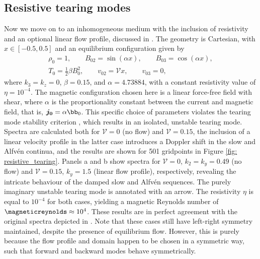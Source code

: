 \subsection{Resistive tearing modes}
Now we move on to an inhomogeneous medium with the inclusion of resistivity and an optional linear flow profile, discussed in \citet{book_MHD}. The geometry is Cartesian, with $x \in [-0.5, 0.5]$ and an equilibrium configuration given by
\begin{equation} \label{eq: resistive_tearing}
  \begin{gathered}
    \rho_0 = 1,
    \qquad
    B_{02} = \sin(\alpha x),
    \qquad
    B_{03} = \cos(\alpha x), \\
    T_0 = \frac{1}{2}\beta B_0^2,
    \qquad
    v_{02} = \mathcal{V}x,
    \qquad
    v_{03} = 0,
  \end{gathered}
\end{equation}
where $k_3 = k_z = 0$, $\beta = 0.15$, and $\alpha = 4.73884$, with a constant resistivity value of $\eta = 10^{-4}$. The magnetic configuration chosen here is a linear force-free field with shear, where $\alpha$ is the proportionality constant between the current and magnetic field, that is, $\boldsymbol{j_0} = \alpha \bb_0$. This specific choice of parameters violates the tearing mode stability criterion \citep{book_MHD}, which results in an isolated, unstable tearing mode. Spectra are calculated both for $\mathcal{V} = 0$ (no flow) and $\mathcal{V} = 0.15$, the inclusion of a linear velocity profile in the latter case introduces a Doppler shift in the slow and Alfv\'en continua, and the results are shown for 501 gridpoints in Figure \ref{fig: resistive_tearing}. Panels a and b show spectra for
$\mathcal{V} = 0$, $k_2 = k_y = 0.49$ (no flow) and $\mathcal{V} = 0.15$, $k_y = 1.5$ (linear flow profile), respectively, revealing the intricate behaviour of the damped slow and Alfv\'en sequences. The purely imaginary unstable tearing mode is annotated with an arrow. The resistivity $\eta$ is equal to $10^{-4}$ for both cases, yielding a magnetic Reynolds number of $\magneticreynolds \approx 10^4$. These results are in perfect agreement with the original spectra depicted in \citet[Figures 14.7--14.9]{book_MHD}. Note that these cases still have left-right symmetry maintained, despite the presence of equilibrium flow. However, this is purely because the flow profile and domain happen to be chosen in a symmetric way, such that forward and backward modes behave symmetrically.


